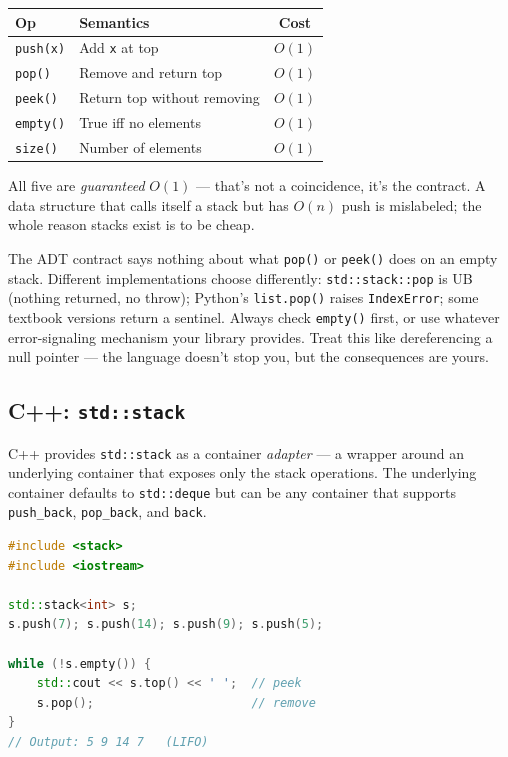 \documentclass[11pt]{article}
\begin{document}
\begin{center}
\begin{tabular}{|l|l|c|}
\hline
\textbf{Op} & \textbf{Semantics} & \textbf{Cost} \\
\hline
\texttt{push(x)}  & Add \texttt{x} at top           & $O(1)$ \\
\texttt{pop()}    & Remove and return top           & $O(1)$ \\
\texttt{peek()}   & Return top without removing     & $O(1)$ \\
\texttt{empty()}  & True iff no elements            & $O(1)$ \\
\texttt{size()}   & Number of elements              & $O(1)$ \\
\hline
\end{tabular}
\end{center}

All five are \emph{guaranteed} $O(1)$ --- that's not a coincidence,
it's the contract. A data structure that calls itself a stack but
has $O(n)$ push is mislabeled; the whole reason stacks exist is to
be cheap.

\begin{warnbox}
The ADT contract says nothing about what \texttt{pop()} or
\texttt{peek()} does on an empty stack. Different implementations
choose differently: \texttt{std::stack::pop} is UB (nothing
returned, no throw); Python's \texttt{list.pop()} raises
\texttt{IndexError}; some textbook versions return a sentinel.
Always check \texttt{empty()} first, or use whatever
error-signaling mechanism your library provides. Treat this like
dereferencing a null pointer --- the language doesn't stop you,
but the consequences are yours.
\end{warnbox}

\subsection*{C++: \texttt{std::stack}}

C++ provides \texttt{std::stack} as a container \emph{adapter} ---
a wrapper around an underlying container that exposes only the
stack operations. The underlying container defaults to
\texttt{std::deque} but can be any container that supports
\texttt{push\_back}, \texttt{pop\_back}, and \texttt{back}.

\begin{examplebox}
\begin{lstlisting}[language=C++,basicstyle=\ttfamily\small,frame=single]
#include <stack>
#include <iostream>

std::stack<int> s;
s.push(7); s.push(14); s.push(9); s.push(5);

while (!s.empty()) {
    std::cout << s.top() << ' ';  // peek
    s.pop();                      // remove
}
// Output: 5 9 14 7   (LIFO)
\end{lstlisting}
\end{examplebox}
\end{document}
